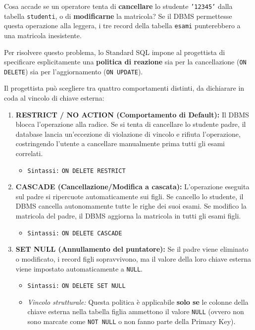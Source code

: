 Cosa accade se un operatore tenta di \textbf{cancellare} lo studente \texttt{'12345'} dalla tabella \texttt{studenti}, o di \textbf{modificarne} la matricola? 
Se il DBMS permettesse questa operazione alla leggera, i tre record della tabella \texttt{esami} punterebbero a una matricola inesistente.

Per risolvere questo problema, lo Standard SQL impone al progettista di specificare esplicitamente una \textbf{politica di reazione} sia per la cancellazione (\texttt{ON DELETE}) sia per l'aggiornamento (\texttt{ON UPDATE}).

Il progettista può scegliere tra quattro comportamenti distinti, da dichiarare in coda al vincolo di chiave esterna:

\begin{enumerate}
    \item \textbf{RESTRICT / NO ACTION (Comportamento di Default):}
    Il DBMS blocca l'operazione alla radice. Se si tenta di cancellare lo studente padre, il database lancia un'eccezione di violazione di vincolo e rifiuta l'operazione, costringendo l'utente a cancellare manualmente prima tutti gli esami correlati.
    \begin{itemize}
        \item \texttt{Sintassi:} \texttt{ON DELETE RESTRICT}
    \end{itemize}

    \item \textbf{CASCADE (Cancellazione/Modifica a cascata):}
    L'operazione eseguita sul padre si ripercuote automaticamente sui figli. Se cancello lo studente, il DBMS cancella autonomamente tutte le righe dei suoi esami. Se modifico la matricola del padre, il DBMS aggiorna la matricola in tutti gli esami figli.
    \begin{itemize}
        \item \texttt{Sintassi:} \texttt{ON DELETE CASCADE}
    \end{itemize}

    \item \textbf{SET NULL (Annullamento del puntatore):}
    Se il padre viene eliminato o modificato, i record figli sopravvivono, ma il valore della loro chiave esterna viene impostato automaticamente a \texttt{NULL}. 
    \begin{itemize}
        \item \texttt{Sintassi:} \texttt{ON DELETE SET NULL}
        \item \textit{Vincolo strutturale:} Questa politica è applicabile \textbf{solo se} le colonne della chiave esterna nella tabella figlia ammettono il valore \texttt{NULL} (ovvero non sono marcate come \texttt{NOT NULL} o non fanno parte della Primary Key).
    \end{itemize}


\end{enumerate}
